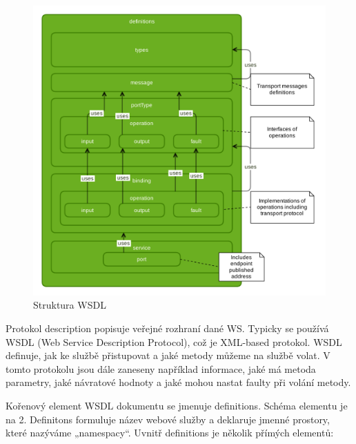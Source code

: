 \documentclass[11pt,twoside,a4paper]{book}
\begin{document}
\begin{figure}[h]
\begin{center}
\includegraphics[width=12cm]{images-pdf/wsdl.pdf} 
\caption{Struktura WSDL}
\label{fig:logo}
\end{center}
\end{figure}

Protokol description popisuje veřejné rozhraní dané WS. Typicky se používá WSDL (Web
Service Description Protocol), což je XML-based protokol. WSDL definuje, jak ke službě
přistupovat a jaké metody můžeme na službě volat. V tomto protokolu jsou dále zaneseny
například informace, jaké má metoda parametry, jaké návratové hodnoty a jaké mohou nastat
faulty při volání metody.

Kořenový element WSDL dokumentu se jmenuje definitions. Schéma elementu je na 2.
Definitons formuluje název webové služby a deklaruje jmenné prostory, které nazýváme
„namespacy“. Uvnitř definitions je několik přímých elementů:
\end{document}
